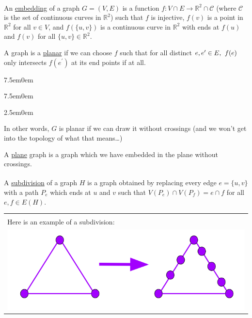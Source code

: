 \documentclass{book}
\newcommand{\teachComment}{
   \color{Orange}%
   \fontsize{12}{14}\selectfont%
}
\newcommand{\exOne}{%
   \color{Purple}%
   \fontsize{14}{16}\selectfont%
}
\newenvironment{myIndent}{%
   \begin{adjustwidth}{2.5em}{0em}%
}{%
   \end{adjustwidth}%
}
\newenvironment{myTindent}{%
   \begin{adjustwidth}{7.5em}{0em}%
}{%
   \end{adjustwidth}%
}
\newcommand{\udefine}[1]{%
   \setulcolor{Red}%
   \setul{0.14em}{0.07em}%
   \ul{#1}%
}
\newcommand{\mySepOne}[1][.]{%
   {\noindent\color{#1}{\rule{6.5in}{1mm}}}\\%
}
\newcommand{\mySepTwo}[1][.]{%
   {\noindent\color{#1}{\rule{6.5in}{0.5mm}}}\\%
}
\newenvironment{myClosureOne}[2][.]{%
   \color{#1}%
   \begin{tabular}{|p{#2in}|} \hline \\%
}{%
   \\ \hline \end{tabular}%
}
\newcommand{\retTwo}{\hfill\bigbreak}
\begin{document}
\mySepOne

An \udefine{embedding} of a graph $G = (V, E)$ is a function $f: V\cap E\longrightarrow \mathbb{R}^2 \cap \mathcal{C}$ (where $\mathcal{C}$ is the set of continuous curves in $\mathbb{R}^2$) such that $f$ is injective, $f(v)$ is a point in $\mathbb{R}^2$ for all $v \in V$, and $f(\{u, v\})$ is a continuous curve in $\mathbb{R}^2$ with ends at $f(u)$ and $f(v)$ for all $\{u, v\} \in \mathbb{R}^2$. \retTwo

A graph is a \udefine{planar} if we can choose $f$ such that for all distinct $e, e^\prime \in E, \hspace{0.4em} f(e)$ only intersects  $f(e^\prime)$ at its end points if at all.
{\begin{myTindent}\begin{myTindent}\begin{myIndent} \teachComment
   In other words, $G$ is planar if we can draw it without crossings (and we won't get into the topology of what that means\dots) \retTwo
\end{myIndent}\end{myTindent}\end{myTindent}}

A \udefine{plane} graph is a graph which we have embedded in the plane without crossings.\\ 

\mySepTwo

A \udefine{subdivision} of a graph $H$ is a graph obtained by replacing every edge $e = \{u, v\}$ with a path $P_e$ which ends at $u$ and $v$ such that $V(P_e) \cap V(P_f) = e \cap f$ for all $e, f \in E(H)$.

{\begin{center} \exOne
   {\begin{myClosureOne}{3.7}
      Here is an example of a subdivision:\\
      \includegraphics[scale=0.75]{Subdivision_Image.png}
   \end{myClosureOne}}
\end{center}}
\end{document}
